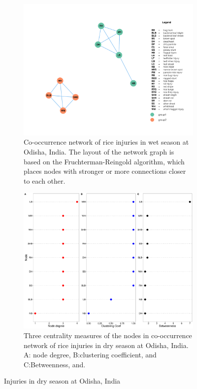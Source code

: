 \begin{figure}
    \centering
    \begin{subfigure}[b]{1\textwidth}
        \includegraphics[width = 1\textwidth]{figures/networkOR_ds/networkOR_ds.pdf}
        \caption{Co-occurrence network of rice injuries in wet season at Odisha, India. The layout of the network graph is based on the Fruchterman-Reingold algorithm, which places nodes with stronger or more connections closer to each other.}
        \label{fig:networkOR_ds}
    \end{subfigure}
    \begin{subfigure}[b]{1\textwidth}
        \includegraphics[width = 1\textwidth]{figures/nodepropOR_ds/nodepropOR_ds.pdf}
        \caption{Three centrality measures of the nodes in co-occurrence network of rice injuries in dry season at Odisha, India. A: node degree, B:clustering coefficient, and C:Betweenness, and.}
        \label{fig:nodepropCP_ds}
    \end{subfigure}
    \caption{Injuries in dry season at Odisha, India}
    \label{fig:OR_ds}
\end{figure}

